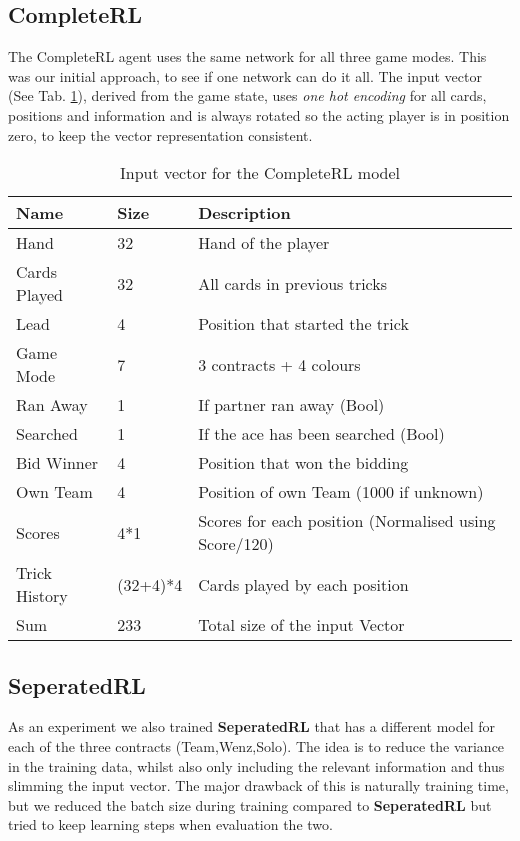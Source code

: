 {\subsection{CompleteRL}
The CompleteRL agent uses the same network for all three game modes.
This was our initial approach, to see if one network can do it all.
The input vector (See Tab. \ref{tab:CompleteRLinput}), derived from the game state, uses \textit{one hot encoding}
for all cards, positions and information and is always rotated so the acting player is in position zero, to keep the
vector representation
consistent.\\
\begin{table}[!h]
\centering
\begin{tabular}{lll}
\toprule
Name          & Size     & Description                                           \\
\midrule
Hand          & 32       & Hand of the player                                    \\
Cards Played  & 32       & All cards in previous tricks                          \\
Lead          & 4        & Position that started the trick                       \\
Game Mode     & 7        & 3 contracts + 4 colours                               \\
Ran Away      & 1        & If partner ran away (Bool)                            \\
Searched      & 1        & If the ace has been searched (Bool)                   \\
Bid Winner    & 4        & Position that won the bidding                         \\
Own Team      & 4        & Position of own Team (1000 if unknown)                \\
Scores        & 4*1      & Scores for each position (Normalised using Score/120) \\
Trick History & (32+4)*4 & Cards played by each position                        \\
\midrule
Sum & 233 & Total size of the input Vector\\
\bottomrule
\end{tabular}
\caption{Input vector for the CompleteRL model}
\label{tab:CompleteRLinput}
\end{table}

\subsection{SeperatedRL}
As an experiment we also trained \textbf{SeperatedRL} that has a different model for each of the three contracts
(Team,Wenz,Solo).
The idea is to reduce the variance in the training data, whilst also only including the relevant information and thus
slimming the input vector.
The major drawback of this is naturally training time, but we reduced the batch size during training compared to
\textbf{SeperatedRL} but tried to keep learning steps when evaluation the two.

}
